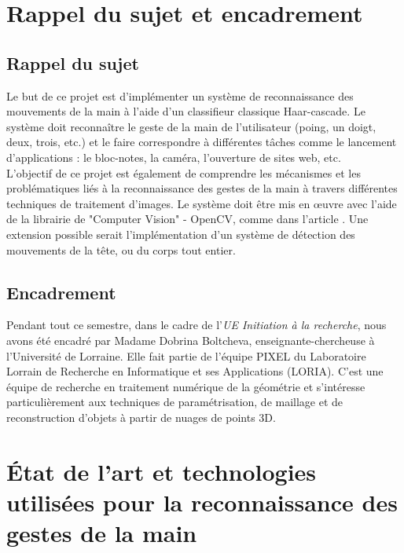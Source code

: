 \documentclass[11pt]{article}
\begin{document}
\newpage

\section{Rappel du sujet et encadrement}
\subsection{Rappel du sujet}

Le but de ce projet est d’implémenter un système de reconnaissance des mouvements de la
main à l’aide d’un classifieur classique Haar-cascade. Le système doit reconnaître le geste de
la main de l’utilisateur (poing, un doigt, deux, trois, etc.) et le faire correspondre à différentes tâches comme le lancement d’applications : le bloc-notes, la caméra, l’ouverture de sites web, etc. \\
L'objectif de ce projet est également de comprendre les mécanismes et les problématiques liés à la reconnaissance des gestes de la main à travers différentes techniques de traitement d’images.
Le système doit être mis en œuvre avec l’aide de la librairie de "Computer Vision" - OpenCV,
comme dans l’article \cite{joshi_static_2021}. Une extension possible serait l’implémentation d’un système de détection
des mouvements de la tête, ou du corps tout entier.

\subsection{Encadrement}
Pendant tout ce semestre, dans le cadre de l'\textit{UE Initiation à la recherche}, nous avons été encadré par Madame Dobrina Boltcheva, enseignante-chercheuse à l'Université de Lorraine.
Elle fait partie de l'équipe PIXEL du Laboratoire Lorrain de Recherche en Informatique et ses Applications (LORIA).
C'est une équipe de recherche en traitement numérique de la géométrie et s'intéresse particulièrement aux techniques de paramétrisation, de maillage et de reconstruction d'objets à partir de nuages de points 3D.


\newpage

\section{\'Etat de l'art et technologies utilisées pour la reconnaissance des gestes de la main}
\end{document}
